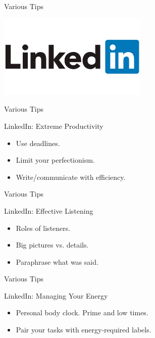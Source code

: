 
\begin{frame}{Various Tips}
  \begin{center}
    \includegraphics[height=4cm]{img/linkedin.png}
  \end{center}
\end{frame}

\begin{frame}{Various Tips}
  \begin{block}{LinkedIn: Extreme Productivity}
    \begin{itemize}
      \item Use deadlines.
      \item Limit your perfectionism.
      \item Write/communicate with efficiency.
    \end{itemize}
  \end{block}
\end{frame}

\begin{frame}{Various Tips}
  \begin{block}{LinkedIn: Effective Listening}
    \begin{itemize}
      \item Roles of listeners. %
      \item Big pictures vs. details.
      \item Paraphrase what was said. %
    \end{itemize}
  \end{block}
\end{frame}

\begin{frame}{Various Tips}
  \begin{block}{LinkedIn: Managing Your Energy}
    \begin{itemize}
      \item Personal body clock. Prime and low times.
      \item Pair your tasks with energy-required labels. 
    \end{itemize}
  \end{block}
\end{frame}

